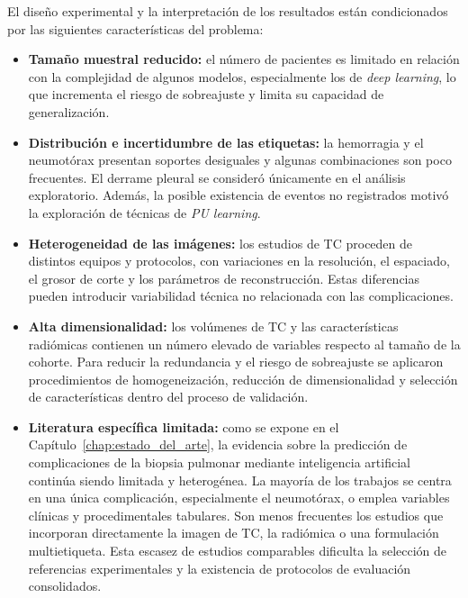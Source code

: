 El diseño experimental y la interpretación de los resultados están condicionados por las siguientes características del problema:

\begin{itemize}
    \item \textbf{Tamaño muestral reducido:} el número de pacientes es limitado en relación con la complejidad de algunos modelos, especialmente los de \textit{deep learning}, lo que incrementa el riesgo de sobreajuste y limita su capacidad de generalización.

    \item \textbf{Distribución e incertidumbre de las etiquetas:} la hemorragia y el neumotórax presentan soportes desiguales y algunas combinaciones son poco frecuentes. El derrame pleural se consideró únicamente en el análisis exploratorio. Además, la posible existencia de eventos no registrados motivó la exploración de técnicas de \textit{PU learning}.

    \item \textbf{Heterogeneidad de las imágenes:} los estudios de TC proceden de distintos equipos y protocolos, con variaciones en la resolución, el espaciado, el grosor de corte y los parámetros de reconstrucción. Estas diferencias pueden introducir variabilidad técnica no relacionada con las complicaciones.

    \item \textbf{Alta dimensionalidad:} los volúmenes de TC y las características radiómicas contienen un número elevado de variables respecto al tamaño de la cohorte. Para reducir la redundancia y el riesgo de sobreajuste se aplicaron procedimientos de homogeneización, reducción de dimensionalidad y selección de características dentro del proceso de validación.

    \item \textbf{Literatura específica limitada:} como se expone en el Capítulo~\ref{chap:estado_del_arte}, la evidencia sobre la predicción de complicaciones de la biopsia pulmonar mediante inteligencia artificial continúa siendo limitada y heterogénea. La mayoría de los trabajos se centra en una única complicación, especialmente el neumotórax, o emplea variables clínicas y procedimentales tabulares. Son menos frecuentes los estudios que incorporan directamente la imagen de TC, la radiómica o una formulación multietiqueta. Esta escasez de estudios comparables dificulta la selección de referencias experimentales y la existencia de protocolos de evaluación consolidados.

\end{itemize}


